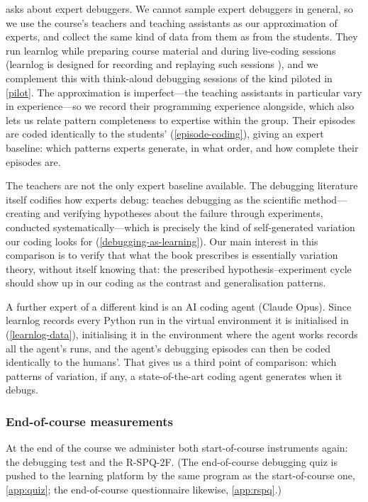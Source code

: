  asks about expert debuggers.
We cannot sample expert debuggers in general, so we use the course's teachers
and teaching assistants as our approximation of experts, and collect the same
kind of data from them as from the students.
They run learnlog while preparing course material and during live-coding
sessions (learnlog is designed for recording and replaying such sessions
\autocite{learnlog}), and we complement this with think-aloud debugging
sessions of the kind piloted in \cref{pilot}.
The approximation is imperfect---the teaching assistants in particular vary
in experience---so we record their programming experience alongside, which
also lets us relate pattern completeness to expertise within the group.
Their episodes are coded identically to the students'
(\cref{episode-coding}), giving an expert baseline: which patterns experts
generate, in what order, and how complete their episodes are.

The teachers are not the only expert baseline available.
The debugging literature itself codifies how experts debug:
\textcite{WhyProgramsFail} teaches debugging as the scientific
method---creating and verifying hypotheses about the failure through
experiments, conducted systematically---which is precisely the kind of
self-generated variation our coding looks for
(\cref{debugging-as-learning}).
Our main interest in this comparison is to verify that what the book
prescribes is essentially variation theory, without itself knowing that:
the prescribed hypothesis--experiment cycle should show up in our coding
as the contrast and generalisation patterns.

A further expert of a different kind is an AI coding agent (Claude
Opus).
Since learnlog records every Python run in the virtual environment it is
initialised in (\cref{learnlog-data}), initialising it in the
environment where the agent works records all the agent's runs, and the
agent's debugging episodes can then be coded identically to the humans'.
That gives us a third point of comparison: which patterns of variation,
if any, a state-of-the-art coding agent generates when it debugs.

\subsubsection{End-of-course measurements}
\label{end-measure}

At the end of the course we administer both start-of-course instruments
again: the debugging test and the R-SPQ-2F.
(The end-of-course debugging quiz is pushed to the learning platform by
the same program as the start-of-course one, \cref{app:quiz}; the
end-of-course questionnaire likewise, \cref{app:rspq}.)


